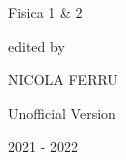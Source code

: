 \begin{titlepage}
\begin{center}
		\Huge \doublespacing \bfseries \begin{spacing}{1}{Fisica 1 \& 2}\end{spacing}
		\hfill
		\normalsize \itshape \begin{spacing}{1}{}\end{spacing}
		\hfill
		\normalsize\itshape \begin{spacing}{1}{edited by}\end{spacing}
		\hfill
		\Large\itshape  \begin{spacing}{1}{NICOLA FERRU}\end{spacing}
		\vspace{0.5cm}
		
		\hfill
		\vfill
		\Large \bfseries \begin{spacing}{1}{Unofficial Version}\end{spacing}
		\vspace{0.5cm}
		{\small 2021 -  2022}
	\end{center}
	\clearpage
	\thispagestyle{empty}
	\vspace*{\fill}%
	{\par}%
	\vspace{\fill}
\end{titlepage}
